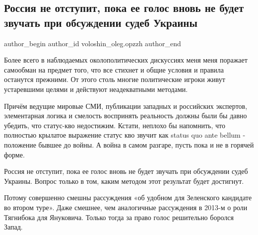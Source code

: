  
 
 
 
 
 
\subsection{Россия не отступит, пока ее голос вновь не будет звучать при обсуждении судеб Украины}
\label{sec:23_01_2022.fb.voloshin_oleg.opzzh.1.rossia_ne_otstupit}
 
\ifcmt
 author_begin
   author_id voloshin_oleg.opzzh
 author_end
\fi

Более всего в наблюдаемых околополитических дискуссиях меня меня поражает
самообман на предмет того, что все стихнет и общие условия и правила останутся
прежними. От этого столь многие политические игроки живут устаревшими целями и
действуют неадекватными методами. 

Причём ведущие мировые СМИ, публикации западных и российских экспертов,
элементарная логика и смелость воспринять реальность должны были бы давно
убедить, что статус-кво недостижим. Кстати, неплохо бы напомнить, что полностью
крылатое выражение статус кво звучит как status quo ante bellum - положение
бывшее до войны. А война в самом разгаре, пусть пока и не в горячей форме.

Россия не отступит, пока ее голос вновь не будет звучать при обсуждении судеб
Украины. Вопрос только в том, каким методом этот результат будет достигнут. 

Потому совершенно смешны рассуждения «об удобном для Зеленского кандидате во
втором туре». Даже смешнее, чем аналогичные рассуждения в 2013-м о роли
Тягнибока для Януковича. Только тогда за право голос решительно боролся Запад.

